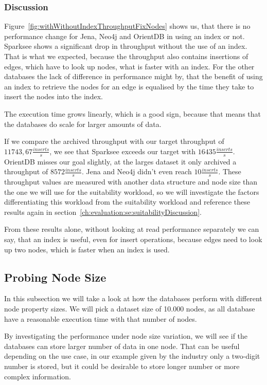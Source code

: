 \subsubsection{Discussion}
Figure~\ref{fig:withWithoutIndexThroughputFixNodes} shows us,
that there is no performance change for Jena, Neo4j and OrientDB in using an index or not.
Sparksee shows a significant drop in throughput without the use of an index.
That is what we expected,
because the throughput also contains insertions of edges,
which have to look up nodes,
what is faster with an index.
For the other databases the lack of difference in performance might by,
that the benefit of using an index to retrieve the nodes for an edge is equalised by the time they take to insert the nodes into the index.

The execution time grows linearly,
which is a good sign,
because that means that the databases do scale for larger amounts of data.

If we compare the archived throughput with our target throughput of $ 11743,67 \frac{inserts}{s} $,
we see that Sparksee exceeds our target with $ 16435 \frac{inserts}{s} $.
OrientDB misses our goal slightly,
at the larges dataset it only archived a throughput of $ 8572 \frac{inserts}{s} $.
Jena and Neo4j didn't even reach $ 10 \frac{inserts}{s} $.
These throughput values are measured with another data structure and node size than the one we will use for the suitability workload,
so we will investigate the factors differentiating this workload from the suitability workload and reference these results again in section~\ref{ch:evaluation:se:suitabilityDiscussion}.

From these results alone,
without looking at read performance separately we can say,
that an index is useful,
even for insert operations,
because edges need to look up two nodes,
which is faster when an index is used.

\subsection{Probing Node Size}
\label{ch:evaluation:se:probingNodeSize}
In this subsection we will take a look at how the databases perform with different node property sizes.
We will pick a dataset size of 10.000 nodes,
as all database have a reasonable execution time with that number of nodes.

By investigating the performance under node size variation,
we will see if the databases can store larger number of data in one node.
That can be useful depending on the use case,
in our example given by the industry only a two-digit number is stored,
but it could be desirable to store longer number or more complex information.

